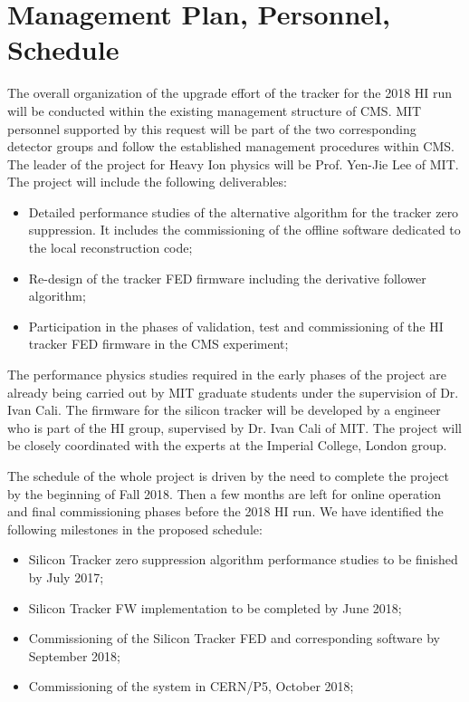 \section{Management Plan, Personnel, Schedule}
\label{sec:management}

The overall organization of the upgrade effort of the tracker%
for the 2018 HI run will be conducted within the existing management structure of CMS. MIT personnel supported by this request will be part of the two corresponding detector groups and follow the established management procedures within CMS. The leader of the project for Heavy Ion physics will be Prof. Yen-Jie Lee of MIT. The project will include the following deliverables:

\begin{itemize}
\item Detailed performance studies of the alternative algorithm for the tracker zero suppression. It includes the commissioning of the offline software dedicated to the local reconstruction code;
\item Re-design of the tracker FED firmware including the derivative follower algorithm;
\item Participation in the phases of validation, test and commissioning of the HI tracker FED firmware in the CMS experiment;
\end{itemize}

The performance physics studies required in the early phases of the project are already being carried out by MIT graduate students under the supervision of Dr. Ivan Cali. The firmware for the silicon tracker will be developed by a engineer who is part of the HI group, supervised by Dr. Ivan Cali of MIT. The project will be closely coordinated with the experts at the Imperial College, London group.

The schedule of the whole project is driven by the need to complete the project by the beginning of Fall 2018. Then a few months are left for online operation and final commissioning phases before the 2018 HI run. We have identified the following milestones in the proposed schedule:

\begin{itemize}
\item Silicon Tracker zero suppression algorithm performance studies to be finished by July 2017;
\item Silicon Tracker FW implementation to be completed by June 2018;
\item Commissioning of the Silicon Tracker FED and corresponding software by September 2018;
\item Commissioning of the system in CERN/P5, October 2018;
\end{itemize}
